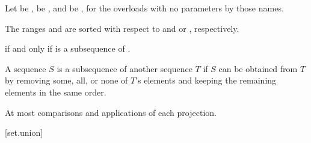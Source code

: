 \begin{itemdescr}
\pnum
Let  be ,
 be , and
 be ,
for the overloads with no parameters by those names.

\pnum
\expects
The ranges  and  are sorted
with respect to  and  or , respectively.

\pnum
\returns
{}
if and only if  is a subsequence of .
\begin{note}
A sequence $S$ is a subsequence of another sequence $T$ if $S$ can be obtained
from $T$ by removing some, all, or none of $T$'s elements and keeping the
remaining elements in the same order.
\end{note}

\pnum
\complexity
At most 
comparisons and applications of each projection.
\end{itemdescr}

[set.union]{}


